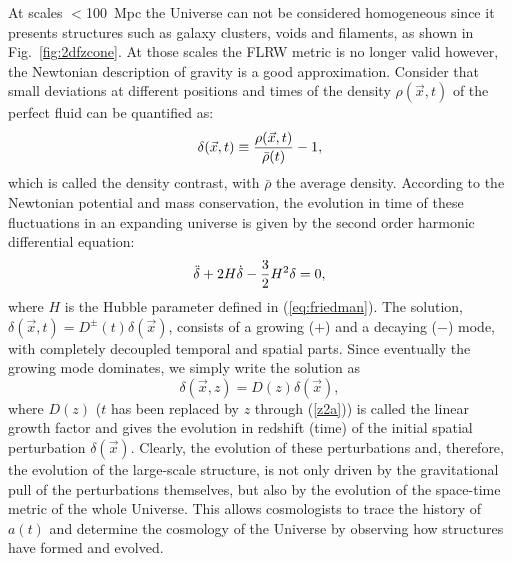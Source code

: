 At scales $<$100~Mpc the Universe can not be considered homogeneous since it presents structures such as galaxy clusters, voids and filaments, as shown in Fig.~\ref{fig:2dfzcone}. At those scales the FLRW metric is no longer valid however, the Newtonian description of gravity is a good approximation. Consider that small deviations at different positions and times of the density $\rho(\vec{x},t)$ of the perfect fluid can be quantified as:
\begin{equation}
\delta(\vec{x}, t) \equiv {\rho(\vec{x},t) \over \bar{\rho}(t)} - 1,
\end{equation}
which is called the density contrast, with $\bar{\rho}$ the average density. According to the Newtonian potential and mass conservation, the evolution in time of these fluctuations in an expanding universe is given by the second order harmonic differential equation:
\begin{equation}
\ddot{\delta} + 2H\dot{\delta} - {3 \over 2}H^2 \delta = 0,
\label{eq:diff_delta}
\end{equation}
where $H$ is the Hubble parameter defined in (\ref{eq:friedman}). The solution, $\delta(\vec{x},t) = D^{\pm}(t)\delta(\vec{x})$, consists of a growing ($+$) and a decaying ($-$) mode, with completely decoupled temporal and spatial parts. Since eventually the growing mode dominates, we simply write the solution as 
\begin{equation}
\delta(\vec{x},z) = D(z)\delta(\vec{x}),
\label{eq:growth_factor}
\end{equation}
where $D(z)$ ($t$ has been replaced by $z$ through (\ref{z2a})) is called the linear growth factor and gives the evolution in redshift (time) of the initial spatial perturbation $\delta(\vec{x})$.
Clearly, the evolution of these perturbations and, therefore, the evolution of the large-scale structure, is not only driven by the gravitational pull of the perturbations themselves, but also by the evolution of the space-time metric of the whole Universe. This allows cosmologists to trace the history of $a(t)$ and determine the cosmology of the Universe by observing how structures have formed and evolved.
